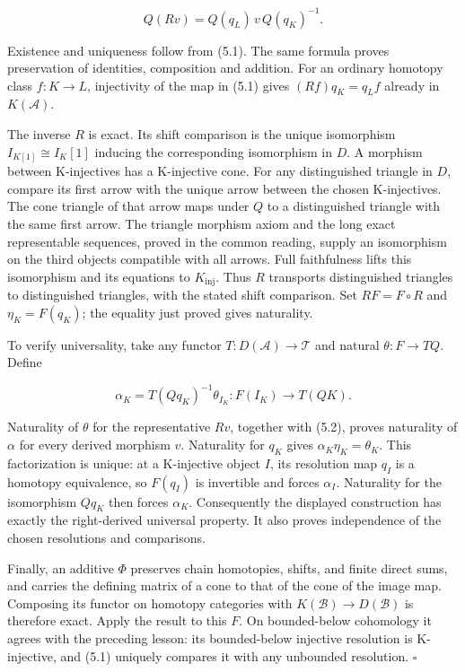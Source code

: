 \documentclass[
  english,
  11pt,
  a4paper,
]{article}
\begin{document}
\[Q(Rv)=Q(q_L)\,v\,Q(q_K)^{-1}.
\tag{5.2}\]

Existence and uniqueness follow from (5.1). The same formula proves
preservation of identities, composition and addition. For an ordinary
homotopy class \(f:K\to L\), injectivity of the map in (5.1) gives
\((Rf)q_K=q_Lf\) already in \(K(\mathcal A)\).

The inverse \(R\) is exact. Its shift comparison is the unique
isomorphism \(I_{K[1]}\cong I_K[1]\) inducing the corresponding
isomorphism in \(D\). A morphism between K-injectives has a K-injective
cone. For any distinguished triangle in \(D\), compare its first arrow
with the unique arrow between the chosen K-injectives. The cone triangle
of that arrow maps under \(Q\) to a distinguished triangle with the same
first arrow. The triangle morphism axiom and the long exact
representable sequences, proved in the common reading, supply an
isomorphism on the third objects compatible with all arrows. Full
faithfulness lifts this isomorphism and its equations to
\(K_{\mathrm{inj}}\). Thus \(R\) transports distinguished triangles to
distinguished triangles, with the stated shift comparison. Set
\(RF=F\circ R\) and \(\eta_K=F(q_K)\); the equality just proved gives
naturality.

To verify universality, take any functor
\(T:D(\mathcal A)\to\mathcal T\) and natural \(\theta:F\to TQ\). Define

\[\alpha_K=T(Qq_K)^{-1}\theta_{I_K}:
F(I_K)\longrightarrow T(QK).
\tag{5.3}\]

Naturality of \(\theta\) for the representative \(Rv\), together with
(5.2), proves naturality of \(\alpha\) for every derived morphism \(v\).
Naturality for \(q_K\) gives \(\alpha_K\eta_K=\theta_K\). This
factorization is unique: at a K-injective object \(I\), its resolution
map \(q_I\) is a homotopy equivalence, so \(F(q_I)\) is invertible and
forces \(\alpha_I\). Naturality for the isomorphism \(Qq_K\) then forces
\(\alpha_K\). Consequently the displayed construction has exactly the
right-derived universal property. It also proves independence of the
chosen resolutions and comparisons.

Finally, an additive \(\Phi\) preserves chain homotopies, shifts, and
finite direct sums, and carries the defining matrix of a cone to that of
the cone of the image map. Composing its functor on homotopy categories
with \(K(\mathcal B)\to D(\mathcal B)\) is therefore exact. Apply the
result to this \(F\). On bounded-below cohomology it agrees with the
preceding lesson: its bounded-below injective resolution is K-injective,
and (5.1) uniquely compares it with any unbounded resolution.
\(\square\)
\end{document}
